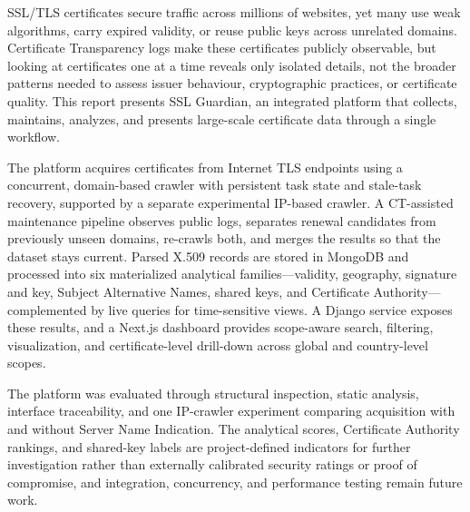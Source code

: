 {}

SSL/TLS certificates secure traffic across millions of websites, yet many use
weak algorithms, carry expired validity, or reuse public keys across unrelated
domains. Certificate Transparency logs make these certificates publicly
observable, but looking at certificates one at a time reveals only isolated
details, not the broader patterns needed to assess issuer behaviour,
cryptographic practices, or certificate quality. This report presents SSL
Guardian, an integrated platform that collects, maintains, analyzes, and
presents large-scale certificate data through a single workflow.

The platform acquires certificates from Internet TLS endpoints using a
concurrent, domain-based crawler with persistent task state and stale-task
recovery, supported by a separate experimental IP-based crawler. A
CT-assisted maintenance pipeline observes public logs, separates renewal
candidates from previously unseen domains, re-crawls both, and merges the
results so that the dataset stays current. Parsed X.509 records are stored in
MongoDB and processed into six materialized analytical families---validity,
geography, signature and key, Subject Alternative Names, shared keys, and
Certificate Authority---complemented by live queries for time-sensitive views.
A Django service exposes these results, and a Next.js dashboard provides
scope-aware search, filtering, visualization, and certificate-level drill-down
across global and country-level scopes.

The platform was evaluated through structural inspection, static analysis,
interface traceability, and one IP-crawler experiment comparing acquisition
with and without Server Name Indication. The analytical scores, Certificate
Authority rankings, and shared-key labels are project-defined indicators for
further investigation rather than externally calibrated security ratings or
proof of compromise, and integration, concurrency, and performance testing
remain future work.

\clearpage
